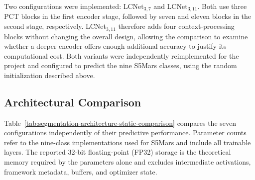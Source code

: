 Two configurations were implemented: LCNet\(_{3,7}\) and LCNet\(_{3,11}\). Both use three PCT blocks in the first encoder stage, followed by seven and eleven blocks in the second stage, respectively. LCNet\(_{3,11}\) therefore adds four context-processing blocks without changing the overall design, allowing the comparison to examine whether a deeper encoder offers enough additional accuracy to justify its computational cost. Both variants were independently reimplemented for the project and configured to predict the nine S5Mars classes, using the random initialization described above.

\subsection{Architectural Comparison}

Table~\ref{tab:segmentation-architecture-static-comparison} compares the seven configurations independently of their predictive performance. Parameter counts refer to the nine-class implementations used for S5Mars and include all trainable layers. The reported 32-bit floating-point (FP32) storage is the theoretical memory required by the parameters alone and excludes intermediate activations, framework metadata, buffers, and optimizer state.

